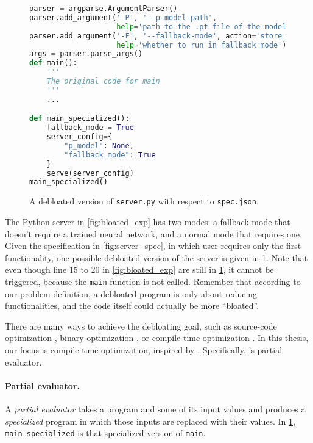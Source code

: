 \begin{figure}[t]
\begin{lstlisting}[language=Python]
parser = argparse.ArgumentParser()
parser.add_argument('-P', '--p-model-path', 
                    help='path to the .pt file of the model')
parser.add_argument('-F', '--fallback-mode', action='store_true', 
                    help='whether to run in fallback mode')
args = parser.parse_args()
def main():
    '''
    The original code for main
    '''
    ...

def main_specialized():
    fallback_mode = True
    server_config={
        "p_model": None,
        "fallback_mode": True
    }
    serve(server_config)
main_specialized()
\end{lstlisting}
    \caption{A debloated version of \texttt{server.py} with respect to \texttt{spec.json}.}
    \label{fig:software_debloated_exp}
\end{figure}
The Python server in \cref{fig:bloated_exp} has two modes: a fallback mode that doesn't require a trained neural network, and a normal mode that requires one. Given the specification in \cref{fig:server_spec}, in which user requires only the first functionality, one possible debloated version of the server is given in \cref{fig:software_debloated_exp}. Note that even though line 15 to 20 in \cref{fig:bloated_exp} are still in \cref{fig:software_debloated_exp}, it cannot be triggered, because the \texttt{main} function is not called. Remember that according to our problem definition, a debloated program is only about reducing functionalities, and the code itself could actually be more ``bloated''.

There are many ways to achieve the debloating goal, such as source-code optimization \cite{chisel}, binary optimization \cite{trimmer}, or compile-time optimization \cite{occam}. In this thesis, our focus is compile-time optimization, inspired by \occam \cite{occam}. Specifically, \occam's partial evaluator.

\paragraph{Partial evaluator.}
A \emph{partial evaluator} takes a program and some of its input values and produces a \emph{specialized} program in which those inputs are replaced with their values. In \cref{fig:software_debloated_exp}, \texttt{main\_specialized} is that specialized version of \texttt{main}.



